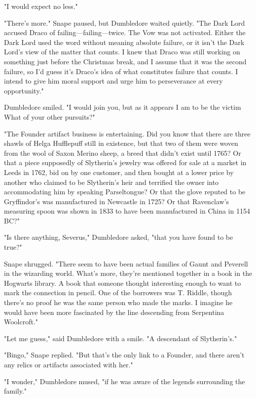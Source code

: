 "I would expect no less."

"There's more." Snape paused, but Dumbledore waited quietly. "The Dark Lord accused Draco of failing—failing—twice. The Vow was not activated. Either the Dark Lord used the word without meaning absolute failure, or it isn't the Dark Lord's view of the matter that counts. I knew that Draco was still working on something just before the Christmas break, and I assume that it was the second failure, so I'd guess it's Draco's idea of what constitutes failure that counts. I intend to give him moral support and urge him to perseverance at every opportunity."

Dumbledore smiled. "I would join you, but as it appears I am to be the victim{\el} What of your other pursuits?"

"The Founder artifact business is entertaining. Did you know that there are three shawls of Helga Hufflepuff still in existence, but that two of them were woven from the wool of Saxon Merino sheep, a breed that didn't exist until 1765? Or that a piece supposedly of Slytherin's jewelry was offered for sale at a market in Leeds in 1762, bid on by one customer, and then bought at a lower price by another who claimed to be Slytherin's heir and terrified the owner into accommodating him by speaking Parseltongue? Or that the glove reputed to be Gryffindor's was manufactured in Newcastle in 1725? Or that Ravenclaw's measuring spoon was shown in 1833 to have been manufactured in China in 1154 BC?"

"Is there anything, Severus," Dumbledore asked, "that you have found to be true?"

Snape shrugged. "There seem to have been actual families of Gaunt and Peverell in the wizarding world. What's more, they're mentioned together in a book in the Hogwarts library. A book that someone thought interesting enough to want to mark the connection in pencil. One of the borrowers was T. Riddle, though there's no proof he was the same person who made the marks. I imagine he would have been more fascinated by the line descending from Serpentina Woolcroft."

"Let me guess," said Dumbledore with a smile. "A descendant of Slytherin's."

"Bingo," Snape replied. "But that's the only link to a Founder, and there aren't any relics or artifacts associated with her."

"I wonder," Dumbledore mused, "if he was aware of the legends surrounding the family."


